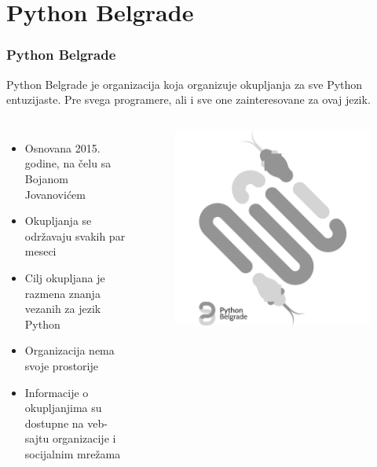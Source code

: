 \documentclass[hyperref={bookmarks=false},aspectratio=169]{beamer}
\begin{document}
\section{Python Belgrade}
\begin{frame}
\frametitle{Python Belgrade}
Python Belgrade je organizacija koja organizuje okupljanja za sve Python entuzijaste. Pre svega programere, ali i sve one zainteresovane za ovaj jezik.

\begin{columns}[T]

\begin{itemize}
    \item Osnovana 2015. godine, na čelu sa Bojanom Jovanovićem
    \item Okupljanja se održavaju svakih par meseci
    \item Cilj okupljana je razmena znanja vezanih za jezik Python
    \item Organizacija nema svoje prostorije
    \item Informacije o okupljanjima su dostupne na veb-sajtu organizacije i socijalnim mrežama
\end{itemize}

\begin{figure}
    \raggedleft
    \includegraphics[scale=0.075]{./images/pybgd.png}
\end{figure}

\end{columns}

\end{frame}
\end{document}
